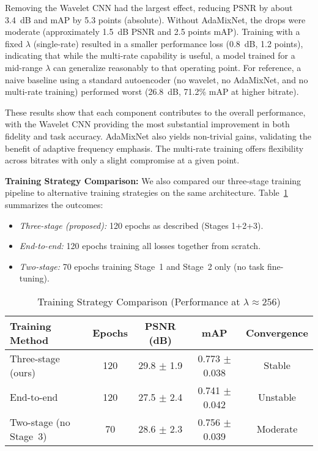 \documentclass[conference]{IEEEtran}
\begin{document}
Removing the Wavelet CNN had the largest effect, reducing PSNR by about 3.4~dB and mAP by 5.3 points (absolute). Without AdaMixNet, the drops were moderate (approximately 1.5~dB PSNR and 2.5 points mAP). Training with a fixed $\lambda$ (single-rate) resulted in a smaller performance loss (0.8~dB, 1.2 points), indicating that while the multi-rate capability is useful, a model trained for a mid-range $\lambda$ can generalize reasonably to that operating point. For reference, a naive baseline using a standard autoencoder (no wavelet, no AdaMixNet, and no multi-rate training) performed worst (26.8~dB, 71.2\% mAP at higher bitrate).

These results show that each component contributes to the overall performance, with the Wavelet CNN providing the most substantial improvement in both fidelity and task accuracy. AdaMixNet also yields non-trivial gains, validating the benefit of adaptive frequency emphasis. The multi-rate training offers flexibility across bitrates with only a slight compromise at a given point.

\textbf{Training Strategy Comparison:} We also compared our three-stage training pipeline to alternative training strategies on the same architecture. Table~\ref{tab:training_comparison} summarizes the outcomes:
\begin{itemize}
\item \textit{Three-stage (proposed):} 120 epochs as described (Stages 1+2+3).
\item \textit{End-to-end:} 120 epochs training all losses together from scratch.
\item \textit{Two-stage:} 70 epochs training Stage~1 and Stage~2 only (no task fine-tuning).
\end{itemize}

\begin{table}[htbp]
\caption{Training Strategy Comparison (Performance at $\lambda\approx256$)}
\label{tab:training_comparison}
\centering
\begin{tabular}{|l|c|c|c|c|}
\hline
\textbf{Training Method} & \textbf{Epochs} & \textbf{PSNR (dB)} & \textbf{mAP} & \textbf{Convergence} \\
\hline
Three-stage (ours) & 120 & 29.8 $\pm$ 1.9 & 0.773 $\pm$ 0.038 & Stable \\
End-to-end         & 120 & 27.5 $\pm$ 2.4 & 0.741 $\pm$ 0.042 & Unstable \\
Two-stage (no Stage~3) & 70  & 28.6 $\pm$ 2.3 & 0.756 $\pm$ 0.039 & Moderate \\
\hline
\end{tabular}
\end{table}
\end{document}
